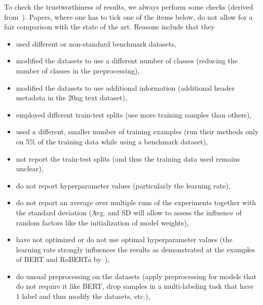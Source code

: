 \documentclass[sigconf, review, nonacm]{acmart}
\begin{document}
\begin{tcolorbox}[title=Instructions: Checklist with Criteria]
To check the trustworthiness of results, we always perform some checks (derived from~\cite{DBLP:journals/corr/abs-2204-03954v5-textclassification}).
%
Papers, where one has to tick one of the items below, do not allow for a fair comparison with the state of the art.
Reasons include that they 

\begin{itemize}
\item used different or non-standard benchmark datasets,

\item modified the datasets to use a different number of classes (\ie reducing the number of classes in the preprocessing),

\item modified the datasets to use additional information (\eg additional header metadata in the 20ng text dataset),

\item employed different train-test splits (\eg use more training samples than others), 

\item used a different, smaller number of training examples (\eg run their methods only on 5\% of the training data while using a benchmark dataset),

\item not report the train-test splits (and thus the training data used remains unclear),

\item do not report hyperparameter values (particularly the learning rate), 

\item do not report an average over multiple runs of the experiments together with the standard deviation (Avg. and SD will allow to assess the influence of random factors like the initialization of model weights),  

\item have not optimized or do not use optimal hyperparameter values (\eg the learning rate strongly influences the results as demonstrated at the examples of BERT and RoBERTa by~\citet{DBLP:journals/corr/abs-2204-03954v5-textclassification}), 

\item do unsual preprocessing on the datasets (\eg apply preprocessing for models that do not require it like BERT, drop samples in a multi-labeling task that have $1$ label and thus modify the datasets, etc.),
%


\end{itemize}
\end{tcolorbox}
\end{document}
